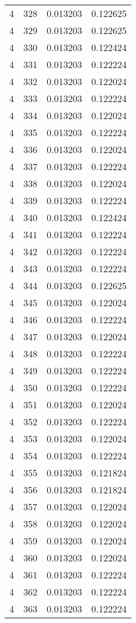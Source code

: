 \begin{longtable}{rrrr}
4 & 328 & 0.013203 & 0.122625 \\
4 & 329 & 0.013203 & 0.122625 \\
4 & 330 & 0.013203 & 0.122424 \\
4 & 331 & 0.013203 & 0.122224 \\
4 & 332 & 0.013203 & 0.122024 \\
4 & 333 & 0.013203 & 0.122224 \\
4 & 334 & 0.013203 & 0.122024 \\
4 & 335 & 0.013203 & 0.122224 \\
4 & 336 & 0.013203 & 0.122024 \\
4 & 337 & 0.013203 & 0.122224 \\
4 & 338 & 0.013203 & 0.122024 \\
4 & 339 & 0.013203 & 0.122224 \\
4 & 340 & 0.013203 & 0.122424 \\
4 & 341 & 0.013203 & 0.122224 \\
4 & 342 & 0.013203 & 0.122224 \\
4 & 343 & 0.013203 & 0.122224 \\
4 & 344 & 0.013203 & 0.122625 \\
4 & 345 & 0.013203 & 0.122024 \\
4 & 346 & 0.013203 & 0.122224 \\
4 & 347 & 0.013203 & 0.122024 \\
4 & 348 & 0.013203 & 0.122224 \\
4 & 349 & 0.013203 & 0.122224 \\
4 & 350 & 0.013203 & 0.122224 \\
4 & 351 & 0.013203 & 0.122024 \\
4 & 352 & 0.013203 & 0.122224 \\
4 & 353 & 0.013203 & 0.122024 \\
4 & 354 & 0.013203 & 0.122224 \\
4 & 355 & 0.013203 & 0.121824 \\
4 & 356 & 0.013203 & 0.121824 \\
4 & 357 & 0.013203 & 0.122024 \\
4 & 358 & 0.013203 & 0.122024 \\
4 & 359 & 0.013203 & 0.122024 \\
4 & 360 & 0.013203 & 0.122024 \\
4 & 361 & 0.013203 & 0.122224 \\
4 & 362 & 0.013203 & 0.122224 \\
4 & 363 & 0.013203 & 0.122224 \\

\end{longtable}
